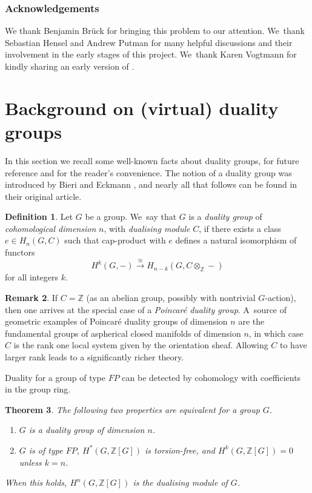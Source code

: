 \documentclass[JEP,XML,SOM,Unicode,NoFloatCountersInSection,published]{cedram}
\theoremstyle{plain}
\newtheorem{thm}{Theorem}[section]
\theoremstyle{definition}
\newtheorem{rem}[thm]{Remark}
\newtheorem{defn}[thm]{Definition}
\newcommand{\Z}{\mathbb Z}
\begin{document}
\subsubsection*{Acknowledgements}
We thank Benjamin Brück for bringing this problem to our attention. We~thank Sebastian Hensel and Andrew Putman for many helpful discussions and their involvement in the early stages of this project. We~thank Karen Vogtmann for kindly sharing an early version of \cite{vogtmann}.

\section{Background on (virtual) duality groups}

In this section we recall some well-known facts about duality groups, for future reference and for the reader's convenience. The notion of a duality group was introduced by Bieri and Eckmann \cite{be}, and nearly all that follows can be found in their original article.

\begin{defn}
Let $G$ be a group. We~say that $G$ is a \emph{duality group} of \emph{cohomological dimension} $n$, with \emph{dualising module} $C$, if there exists a class $e \in H_n(G,C)$ such that cap-product with $e$ defines a natural isomorphism of functors\enlargethispage{.5\baselineskip}
\[
H^k(G,-) \stackrel \cong \longrightarrow H_{n-k}(G,C \otimes_\Z - )
\]
for all integers $k$.
\end{defn}

\begin{rem}If $C=\mathbb{Z}$ (as an abelian group, possibly with nontrivial $G$-action), then one arrives at the special case of a \emph{Poincaré duality group}. A~source of geometric examples of Poincaré duality groups of dimension $n$ are the fundamental groups of aspherical closed manifolds of dimension $n$, in which case $C$ is the rank one local system given by the orientation sheaf. Allowing $C$ to have larger rank leads to a significantly richer theory. \end{rem}

Duality for a group of type $\mathit{FP}$ can be detected by cohomology with coefficients in the group ring.

\pagebreak[2]

\begin{thm}\label{b-e criterion}
The following two properties are equivalent for a group $G$.
\begin{enumerate}
\item\label{b-e criterion1} $G$ is a duality group of dimension $n$.
\item\label{b-e criterion2} $G$ is of type $\mathit{FP}$, $H^*(G,\Z[G])$ is torsion-free, and $H^k(G,\Z[G])=0$ unless $k=n$.
\end{enumerate}
When this holds, $H^n(G,\Z[G])$ is the dualising module of $G$.
\end{thm}
\end{document}
